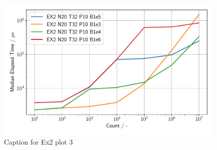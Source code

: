 \begin{figure}[h]
\begin{center}
    \includegraphics[width=1.0\linewidth]{figures/Ex2_3.pdf}
    \caption{Caption for Ex2 plot 3}
    \label{Ex2_3_p}
\end{center}
\end{figure}


